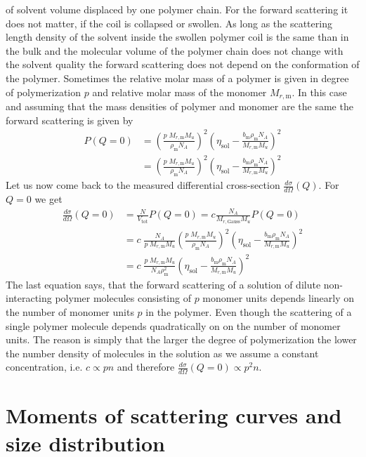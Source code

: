 of solvent volume displaced by one polymer chain.
For the forward scattering it does not matter, if the coil is collapsed or swollen.
As long as the scattering length density of the solvent inside the swollen polymer coil is the
same than in the bulk and the molecular volume of the polymer chain does not change with
the solvent quality the forward scattering does not depend on the conformation of the polymer.
Sometimes the relative molar mass of a polymer is given in degree of polymerization $p$
and relative molar mass of the monomer $M_{r,\mathrm{m}}$.
In this case and assuming that the mass densities of polymer and monomer are the same
the forward scattering is given by
\begin{align}
P(Q\mbox{$=$}0)
&= \left(\frac{p\; M_{r,\mathrm{m}}M_u}{\rho_\mathrm{m} N_A}\right)^2 \left(\eta_\mathrm{sol}-\frac{b_\mathrm{m} \rho_\mathrm{m} N_A}{M_{r,\mathrm{m}}M_u}\right)^2 \nonumber \\
&= \left(\frac{p\; M_{r,\mathrm{m}}M_u}{\rho_\mathrm{m} N_A}\right)^2 \left(\eta_\mathrm{sol}-\frac{b_\mathrm{m} \rho_\mathrm{m} N_A}{M_{r,\mathrm{m}}M_u}\right)^2
\end{align}
Let us now come back to the measured differential cross-section $\frac{d\sigma}{d\Omega}(Q)$. For
$Q=0$ we get
\begin{align}
\frac{d\sigma}{d\Omega}(Q\mbox{$=$}0) &= \frac{N}{V_\text{tot}} P(Q\mbox{$=$}0) = c\frac{N_A}{M_{r,\mathrm{Gauss}} M_u} P(Q\mbox{$=$}0) \\
&= c\; \frac{N_A}{p\; M_{r,\mathrm{m}} M_u} \left(\frac{p\; M_{r,\mathrm{m}}M_u}{\rho_\mathrm{m} N_A}\right)^2 \left(\eta_\mathrm{sol}-\frac{b_\mathrm{m} \rho_\mathrm{m} N_A}{M_{r,\mathrm{m}}M_u}\right)^2 \\
&= c\; \frac{p\; M_{r,\mathrm{m}} M_u}{N_A \rho_\mathrm{m}^2} \left(\eta_\mathrm{sol}-\frac{b_\mathrm{m} \rho_\mathrm{m} N_A}{M_{r,\mathrm{m}}M_u}\right)^2
\end{align}
The last equation says, that the forward scattering of a solution of dilute non-interacting polymer molecules
consisting of $p$ monomer units depends linearly on the number of monomer units $p$ in the polymer.
Even though the scattering of a single polymer molecule depends quadratically on on the number of monomer units.
The reason is simply that the larger the degree of polymerization the lower the number density of molecules in the solution
as we assume a constant concentration, i.e. $c\propto pn$ and therefore $\frac{d\sigma}{d\Omega}(Q\mbox{$=$}0) \propto p^2n$.

\section{Moments of scattering curves and size distribution}
\label{sec:SASmoments}


